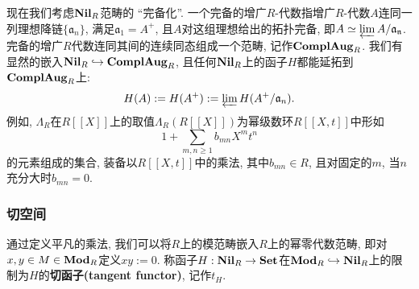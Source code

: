现在我们考虑$\mathbf{Nil}_R$范畴的 ``完备化''.
一个完备的增广$R$-代数指增广$R$-代数$A$连同一列理想降链$\{\mathfrak{a}_n\}$, 满足$\mathfrak{a}_1 = A^+$,
且$A$对这组理想给出的拓扑完备, 即$A\simeq\varprojlim A/\mathfrak{a_n}$.
完备的增广$R$代数连同其间的连续同态组成一个范畴, 记作$\mathbf{ComplAug}_R$.
我们有显然的嵌入$\mathbf{Nil}_R\hookrightarrow\mathbf{ComplAug}_R$, 且任何$\mathbf{Nil}_R$上的函子$H$都能延拓到$\mathbf{ComplAug}_R$上:
\[H(A) := H(A^+) := \varprojlim H(A^+/\mathfrak{a}_n).\]
例如, $\Lambda_R$在$R[[X]]$上的取值$\Lambda_R(R[[X]])$为幂级数环$R[[X, t]]$中形如\[1 + \sum_{m,n\ge 1}b_{mn}X^mt^n\]的元素组成的集合,
装备以$R[[X, t]]$中的乘法, 其中$b_{mn}\in R$, 且对固定的$m$, 当$n$充分大时$b_{mn} = 0$.



\subsubsection{切空间}
通过定义平凡的乘法, 我们可以将$R$上的模范畴嵌入$R$上的幂零代数范畴, 即对$x, y\in M\in\mathbf{Mod}_R$定义$xy := 0$.
称函子$H : \mathbf{Nil}_R\to\mathbf{Set}$在$\mathbf{Mod}_R\hookrightarrow\mathbf{Nil}_R$上的限制为$H$的\textbf{切函子(tangent functor)}, 记作$t_H$.

